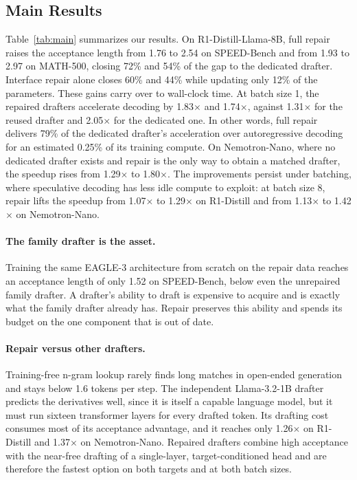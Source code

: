 \documentclass[11pt]{article}
\newcommand{\Ours}{Interface repair}
\begin{document}
\subsection{Main Results}

Table~\ref{tab:main} summarizes our results.
On R1-Distill-Llama-8B, full repair raises the acceptance length from 1.76 to 2.54 on SPEED-Bench and from 1.93 to 2.97 on MATH-500, closing 72\% and 54\% of the gap to the dedicated drafter.
\Ours{} alone closes 60\% and 44\% while updating only 12\% of the parameters.
These gains carry over to wall-clock time.
At batch size 1, the repaired drafters accelerate decoding by 1.83$\times$ and 1.74$\times$, against 1.31$\times$ for the reused drafter and 2.05$\times$ for the dedicated one.
In other words, full repair delivers 79\% of the dedicated drafter's acceleration over autoregressive decoding for an estimated 0.25\% of its training compute.
On Nemotron-Nano, where no dedicated drafter exists and repair is the only way to obtain a matched drafter, the speedup rises from 1.29$\times$ to 1.80$\times$.
The improvements persist under batching, where speculative decoding has less idle compute to exploit: at batch size 8, repair lifts the speedup from 1.07$\times$ to 1.29$\times$ on R1-Distill and from 1.13$\times$ to 1.42$\times$ on Nemotron-Nano.

\paragraph{The family drafter is the asset.}
Training the same EAGLE-3 architecture from scratch on the repair data reaches an acceptance length of only 1.52 on SPEED-Bench, below even the unrepaired family drafter.
A drafter's ability to draft is expensive to acquire and is exactly what the family drafter already has.
Repair preserves this ability and spends its budget on the one component that is out of date.

\paragraph{Repair versus other drafters.}
Training-free n-gram lookup rarely finds long matches in open-ended generation and stays below 1.6 tokens per step.
The independent Llama-3.2-1B drafter predicts the derivatives well, since it is itself a capable language model, but it must run sixteen transformer layers for every drafted token.
Its drafting cost consumes most of its acceptance advantage, and it reaches only 1.26$\times$ on R1-Distill and 1.37$\times$ on Nemotron-Nano.
Repaired drafters combine high acceptance with the near-free drafting of a single-layer, target-conditioned head and are therefore the fastest option on both targets and at both batch sizes.
\end{document}
